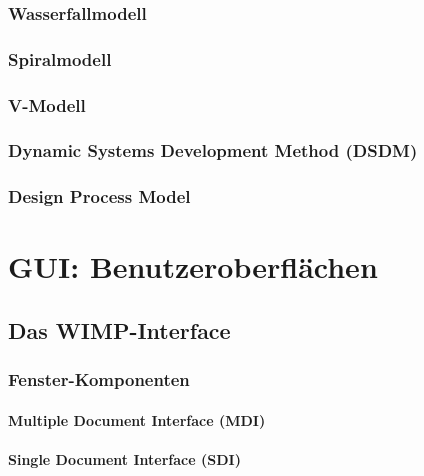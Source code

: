\documentclass[a4paper, 11pt, accentcolor = tud3b]{tudreport}
\begin{document}
				\subsubsection{Wasserfallmodell} %

				\subsubsection{Spiralmodell} %

				\subsubsection{V-Modell} %

				\subsubsection{Dynamic Systems Development Method (DSDM)} %

				\subsubsection{Design Process Model} %

		\section{GUI: Benutzeroberflächen} %

			\subsection{Das WIMP-Interface} %

				\subsubsection{Fenster-Komponenten} %

					\paragraph{Multiple Document Interface (MDI)} %

					\paragraph{Single Document Interface (SDI)} %
\end{document}
